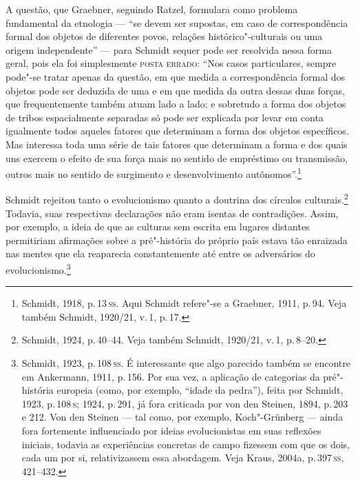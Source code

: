 A questão, que Graebner, seguindo Ratzel, formulara como problema
fundamental da etnologia --- ``se devem ser supostas, em caso de
correspondência formal dos objetos de diferentes povos, relações
histórico"-culturais ou uma origem independente'' --- para Schmidt sequer
pode ser resolvida nessa forma geral, pois ela foi simplesmente \textsc{posta
errado}: ``Nos casos particulares, sempre pode"-se tratar apenas da
questão, em que medida a correspondência formal dos objetos pode ser
deduzida de uma e em que medida da outra dessas duas forças, que
frequentemente também atuam lado a lado; e sobretudo a forma dos objetos
de tribos espacialmente separadas só pode ser explicada por levar em
conta igualmente todos aqueles fatores que determinam a forma dos
objetos específicos. Mas interessa toda uma série de tais fatores que
determinam a forma e dos quais uns exercem o efeito de sua força mais no
sentido de empréstimo ou transmissão, outros mais no sentido de
surgimento e desenvolvimento autônomos''.\footnote{Schmidt, 1918, p.\,13\,\textsc{ss}. Aqui Schmidt refere"-se a Graebner, 1911, p.\,94. Veja também
  Schmidt, 1920/21, v.\,1, p.\,17.}

Schmidt rejeitou tanto o evolucionismo quanto a doutrina dos círculos
culturais.\footnote{Schmidt, 1924, p.\,40--44. Veja também Schmidt,
  1920/21, v.\,1, p.\,8--20.} Todavia, suas respectivas declarações não
eram isentas de contradições. Assim, por exemplo, a ideia de que as
culturas sem escrita em lugares distantes permitiriam afirmações sobre a
pré"-história do próprio país estava tão enraizada nas mentes que ela
reaparecia constantemente até entre os adversários do
evolucionismo.\footnote{Schmidt, 1923, p.\,108\,\textsc{ss}. É interessante que
  algo parecido também se encontre em Ankermann, 1911, p.\,156. Por sua
  vez, a aplicação de categorias da pré"-história europeia (como, por
  exemplo, ``idade da pedra''), feita por Schmidt, 1923, p.\,108\,\textsc{s}; 1924,
  p.\,291, já fora criticada por von den Steinen, 1894, p.\,203 e 212.
  Von den Steinen --- tal como, por exemplo, Koch"-Grünberg --- ainda fora
  fortemente influenciado por ideias evolucionistas em suas reflexões
  iniciais, todavia as experiências concretas de campo fizessem com que
  os dois, cada um por si, relativizassem essa abordagem. Veja Kraus,
  2004a, p.\,397\,\textsc{ss}, 421--432.}

